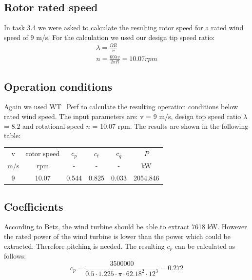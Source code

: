 \documentclass[10pt]{article}
\begin{document}
\subsection{Rotor rated speed}
In task 3.4 we were asked to calculate the resulting rotor speed for a rated wind speed of 9 m/s. For the calculation we used our design tip speed ratio:
\begin{align}
\lambda = \frac{\Omega R}{v}\\
n = \frac{60 \lambda v}{2 \pi R} = 10.07 rpm
\end{align}
\subsection{Operation conditions}
Again we used WT\_Perf to calculate the resulting operation conditions below rated wind speed. The input parameters are: v = 9 m/s, design top speed ratio $\lambda$ = 8.2 and rotational speed $n$ = 10.07 rpm. The results are shown in the following table:\\

\begin{tabular}{|c |c| c| c| c| c|}
\hline
v & rotor speed & $c_p$ & $c_t$ & $c_q$ & $P$\\
m/s &rpm & - &- &-& kW\\
\hline
9 &10.07&0.544&0.825&0.033& 2054.846\\
\hline
\end{tabular}
\subsection{Coefficients}
According to Betz, the wind turbine should be able to extract 7618 kW.
However the rated power of the wind turbine is lower than the power which could be extracted. Therefore pitching is needed. The resulting $c_p$ can be calculated as follows:
\begin{equation}
c_p = \frac{3500000}{0.5 \cdot 1.225 \cdot \pi\cdot  62.18^2 \cdot  12^3} = 0.272
\end{equation}
\end{document}
